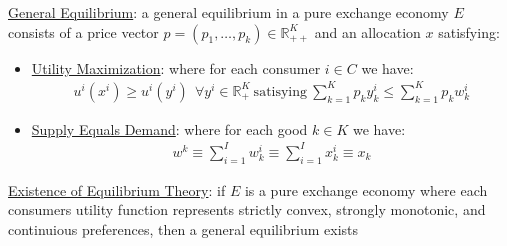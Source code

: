 \documentclass{article}
\begin{document}
  \par
  \underline{General Equilibrium}: a general equilibrium in a pure exchange economy $E$ consists of a price vector $p = (p_{1}, \dots, p_{k}) \in \mathbb{R}_{++}^{K}$ and an allocation $x$ satisfying:
  \begin{itemize}
    \item  \underline{Utility Maximization}: where for each consumer $i \in C$ we have:
    \begin{gather*}
      u^{i}(x^{i}) \geq u^{i}(y^{i}) \ \ \forall y^{i} \in \mathbb{R}_{+}^{K} \ \text{satisying} \ \sum^{K}_{k=1} p_{k}y_{k}^{i} \leq \sum^{K}_{k=1} p_{k}w_{k}^{i}
    \end{gather*}
    \item  \underline{Supply Equals Demand}: where for each good $k \in K$ we have:
    \begin{gather*}
      w^{k} \equiv \sum_{i=1}^{I} w^{i}_{k} \equiv \sum_{i=1}^{I} x_{k}^{i} \equiv x_{k}
    \end{gather*}
  \end{itemize}
  \par
  \underline{Existence of Equilibrium Theory}: if $E$ is a pure exchange economy where each consumers utility function represents strictly convex, strongly monotonic, and continuious preferences, then a general equilibrium exists
\end{document}

